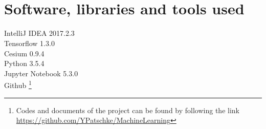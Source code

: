 \documentclass[a4]{article}
\begin{document}
\newpage




\newpage
\listoffigures
 \newpage
\listoftables

\newpage
\clearpage
\appendix
\section{\\Software, libraries and tools used}
IntelliJ IDEA 2017.2.3
\\Tensorflow 1.3.0
\\Cesium 0.9.4
\\Python 3.5.4
\\Jupyter Notebook 5.3.0
\\Github \footnote{Codes and documents of the project can be found by following the link \url{https://github.com/YPatschke/MachineLearning}}
\end{document}
